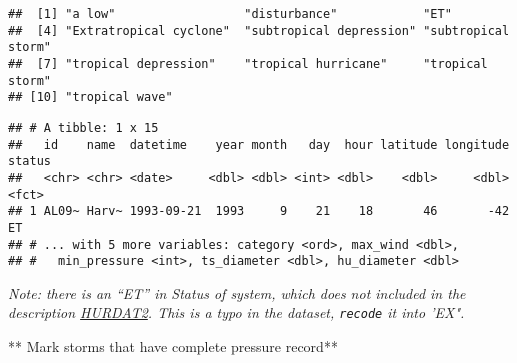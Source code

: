 \documentclass[]{book}
\newenvironment{Shaded}{\begin{snugshade}}{\end{snugshade}}
\newcommand{\DataTypeTok}[1]{\textcolor[rgb]{0.13,0.29,0.53}{#1}}
\newcommand{\KeywordTok}[1]{\textcolor[rgb]{0.13,0.29,0.53}{\textbf{#1}}}
\newcommand{\NormalTok}[1]{#1}
\newcommand{\OperatorTok}[1]{\textcolor[rgb]{0.81,0.36,0.00}{\textbf{#1}}}
\newcommand{\StringTok}[1]{\textcolor[rgb]{0.31,0.60,0.02}{#1}}
\begin{document}
\begin{Shaded}
\end{Shaded}

\begin{verbatim}
##  [1] "a low"                  "disturbance"            "ET"                    
##  [4] "Extratropical cyclone"  "subtropical depression" "subtropical storm"     
##  [7] "tropical depression"    "tropical hurricane"     "tropical storm"        
## [10] "tropical wave"
\end{verbatim}

\begin{Shaded}
\end{Shaded}

\begin{verbatim}
## # A tibble: 1 x 15
##   id    name  datetime    year month   day  hour latitude longitude status
##   <chr> <chr> <date>     <dbl> <dbl> <int> <dbl>    <dbl>     <dbl> <fct> 
## 1 AL09~ Harv~ 1993-09-21  1993     9    21    18       46       -42 ET    
## # ... with 5 more variables: category <ord>, max_wind <dbl>,
## #   min_pressure <int>, ts_diameter <dbl>, hu_diameter <dbl>
\end{verbatim}

\emph{Note: there is an ``ET'' in \emph{Status of system}, which does not included in the description \href{https://www.nhc.noaa.gov/data/hurdat/hurdat2-format-atlantic.pdf}{HURDAT2}. This is a typo in the dataset, \texttt{recode} it into 'EX".}

\begin{Shaded}
\end{Shaded}

** Mark storms that have complete pressure record**
\end{document}
